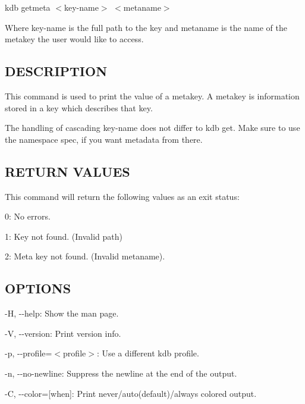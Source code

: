{\ttfamily kdb getmeta $<$key-\/name$>$ $<$metaname$>$}

Where {\ttfamily key-\/name} is the full path to the key and {\ttfamily metaname} is the name of the metakey the user would like to access.

\subsection*{D\+E\+S\+C\+R\+I\+P\+T\+I\+O\+N}

This command is used to print the value of a metakey. A metakey is information stored in a key which describes that key.

The handling of cascading {\ttfamily key-\/name} does not differ to {\ttfamily kdb get}. Make sure to use the namespace {\ttfamily spec}, if you want metadata from there.

\subsection*{R\+E\+T\+U\+R\+N V\+A\+L\+U\+E\+S}

This command will return the following values as an exit status\+:
\begin{DoxyItemize}
\item 0\+: No errors.
\item 1\+: Key not found. (Invalid {\ttfamily path})
\item 2\+: Meta key not found. (Invalid {\ttfamily metaname}).
\end{DoxyItemize}

\subsection*{O\+P\+T\+I\+O\+N\+S}


\begin{DoxyItemize}
\item {\ttfamily -\/\+H}, {\ttfamily -\/-\/help}\+: Show the man page.
\item {\ttfamily -\/\+V}, {\ttfamily -\/-\/version}\+: Print version info.
\item {\ttfamily -\/p}, {\ttfamily -\/-\/profile}=$<$profile$>$\+: Use a different kdb profile.
\item {\ttfamily -\/n}, {\ttfamily -\/-\/no-\/newline}\+: Suppress the newline at the end of the output.
\item {\ttfamily -\/\+C}, {\ttfamily -\/-\/color}=\mbox{[}when\mbox{]}\+: Print never/auto(default)/always colored output.
\end{DoxyItemize}

